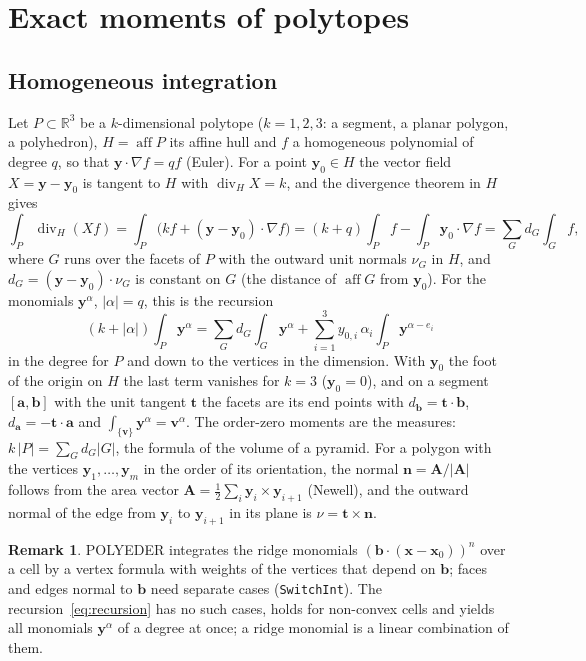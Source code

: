 \documentclass[preprint,12pt]{elsarticle}
\newcommand{\R}{\mathbb{R}}
\newcommand{\bn}{\mathbf{n}}
\newcommand{\bx}{\mathbf{x}}
\newcommand{\by}{\mathbf{y}}
\newcommand{\code}[1]{\texttt{#1}}
\newcommand{\aff}{\operatorname{aff}}
\theoremstyle{definition}
\newtheorem{remark}{Remark}
\begin{document}
\section{Exact moments of polytopes}\label{sec:moments}

\subsection{Homogeneous integration}
Let $P\subset\R^3$ be a $k$-dimensional polytope ($k=1,2,3$: a segment, a planar polygon, a
polyhedron), $H=\aff P$ its affine hull and $f$ a homogeneous polynomial of degree $q$, so that
$\by\cdot\nabla f = q f$ (Euler). For a point $\by_0\in H$ the vector field $X=\by-\by_0$ is
tangent to $H$ with $\operatorname{div}_H X = k$, and the divergence theorem in $H$ gives
\begin{equation}
\int_P \operatorname{div}_H(Xf) = \int_P \big(k f + (\by-\by_0)\cdot\nabla f\big)
= (k+q)\int_P f - \int_P \by_0\cdot\nabla f
= \sum_{G} d_G\int_G f ,
\end{equation}
where $G$ runs over the facets of $P$ with the outward unit normals $\nu_G$ in $H$, and
$d_G = (\by-\by_0)\cdot\nu_G$ is constant on $G$ (the distance of $\aff G$ from $\by_0$). For the
monomials $\by^\alpha$, $|\alpha|=q$, this is the recursion
\begin{equation}\label{eq:recursion}
\boxed{\;(k+|\alpha|)\int_P \by^\alpha = \sum_G d_G\int_G \by^\alpha
+ \sum_{i=1}^3 y_{0,i}\,\alpha_i\int_P \by^{\alpha-e_i}\;}
\end{equation}
in the degree for $P$ and down to the vertices in the dimension. With $\by_0$ the foot of the origin
on $H$ the last term vanishes for $k=3$ ($\by_0=0$), and on a segment $[\mathbf a,\mathbf b]$ with the
unit tangent $\mathbf t$ the facets are its end points with $d_{\mathbf b}=\mathbf t\cdot\mathbf b$,
$d_{\mathbf a}=-\mathbf t\cdot\mathbf a$ and $\int_{\{\mathbf v\}}\by^\alpha = \mathbf v^\alpha$.
The order-zero moments are the measures: $k\,|P| = \sum_G d_G |G|$, the formula of the volume of a
pyramid. For a polygon with the vertices $\by_1,\dots,\by_m$ in the order of its orientation, the
normal $\bn = \mathbf A/|\mathbf A|$ follows from the area vector $\mathbf A=\frac12\sum_i
\by_i\times\by_{i+1}$ (Newell), and the outward normal of the edge from $\by_i$ to $\by_{i+1}$ in its
plane is $\nu = \mathbf t\times\bn$.

\begin{remark}
POLYEDER integrates the ridge monomials $(\mathbf b\cdot(\bx-\bx_0))^n$ over a cell by a vertex
formula with weights of the vertices that depend on $\mathbf b$; faces and edges normal to $\mathbf b$
need separate cases (\code{SwitchInt}). The recursion~\eqref{eq:recursion} has no such cases, holds
for non-convex cells and yields all monomials $\by^\alpha$ of a degree at once; a ridge monomial is a
linear combination of them.
\end{remark}
\end{document}
